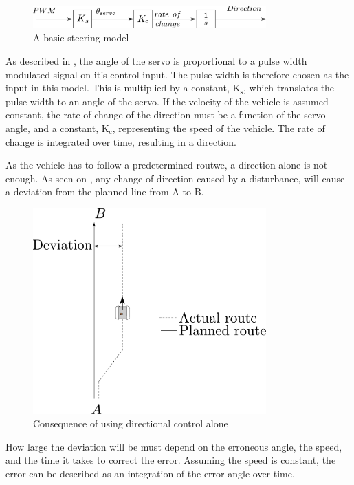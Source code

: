 \begin{figure}[H]
	\centering
	\includegraphics[width=0.8\textwidth]{figures/basicSteeringModel.pdf}
	\caption{A basic steering model}
	\label{basicSteering}
\end{figure}
 
As described in , the angle of the servo is proportional to a pulse width modulated signal on it's control input. The pulse width is therefore chosen as the input in this model. This is multiplied by a constant, $\text{K}_\text{s}$, which translates the pulse width to an angle of the servo.
If the velocity of the vehicle is assumed constant, the rate of change of the direction must be a function of the servo angle, and a constant, $\text{K}_\text{c}$, representing the speed of the vehicle.
The rate of change is integrated over time, resulting in a direction. 

As the vehicle has to follow a predetermined routwe, a direction alone is not enough. As seen on , any change of direction caused by a disturbance, will cause a deviation from the planned line from A to B.

\begin{figure}[H]
	\centering
	\includegraphics[width=0.8\textwidth]{figures/steeringDeviation.pdf}
	\caption{Consequence of using directional control alone}
	\label{SteeringDeviation}
\end{figure}

How large the deviation will be must depend on the erroneous angle, the speed, and the time it takes to correct the error. Assuming the speed is constant, the error can be described as an integration of the error angle over time.


